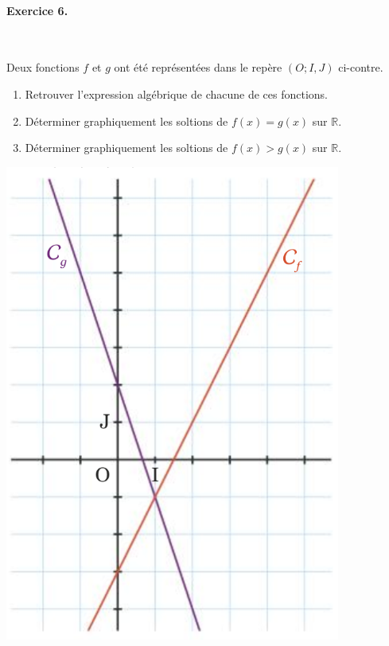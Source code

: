 \documentclass[11pt]{article}
\begin{document}
\paragraph{Exercice 6.}~\\
\begin{minipage}[]{.5\textwidth}
  Deux fonctions $f$ et $g$ ont été représentées dans le repère $(O; I, J)$
  ci-contre.
  \begin{enumerate}
    \item Retrouver l'expression algébrique de chacune de ces fonctions.
    \item Déterminer graphiquement les soltions de $f(x)=g(x)$ sur $\mathbb{R}$.
    \item Déterminer graphiquement les soltions de $f(x)>g(x)$ sur $\mathbb{R}$.
  \end{enumerate}
\end{minipage}
\begin{minipage}[]{.5\textwidth}
  \begin{center}
    \includegraphics[scale=.25]{exo3.png}
  \end{center}
\end{minipage}
\end{document}
